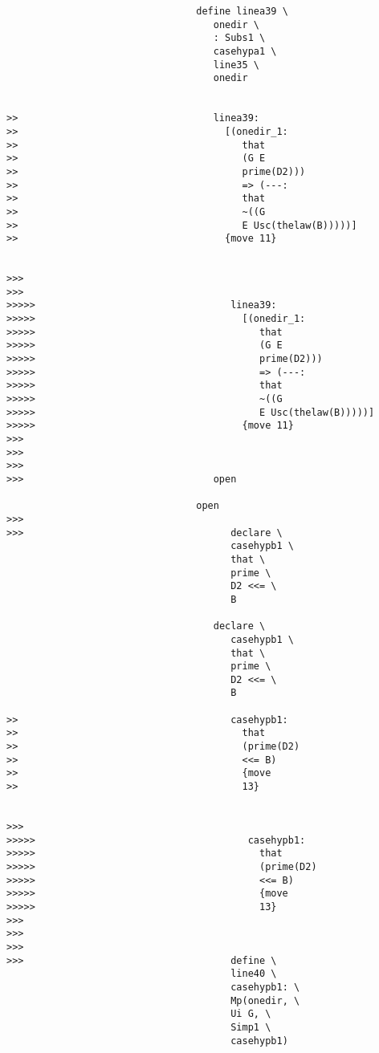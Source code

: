 \documentclass[12pt]{article}
\begin{document}
\begin{verbatim}
                                 define linea39 \
                                    onedir \
                                    : Subs1 \
                                    casehypa1 \
                                    line35 \
                                    onedir


>>                                  linea39:
>>                                    [(onedir_1:
>>                                       that
>>                                       (G E
>>                                       prime(D2)))
>>                                       => (---:
>>                                       that
>>                                       ~((G
>>                                       E Usc(thelaw(B)))))]
>>                                    {move 11}


>>>
>>>
>>>>>                                  linea39:
>>>>>                                    [(onedir_1:
>>>>>                                       that
>>>>>                                       (G E
>>>>>                                       prime(D2)))
>>>>>                                       => (---:
>>>>>                                       that
>>>>>                                       ~((G
>>>>>                                       E Usc(thelaw(B)))))]
>>>>>                                    {move 11}
>>>
>>>
>>>
>>>                                 open

                                 open
>>>
>>>                                    declare \
                                       casehypb1 \
                                       that \
                                       prime \
                                       D2 <<= \
                                       B

                                    declare \
                                       casehypb1 \
                                       that \
                                       prime \
                                       D2 <<= \
                                       B

>>                                     casehypb1:
>>                                       that
>>                                       (prime(D2)
>>                                       <<= B)
>>                                       {move
>>                                       13}


>>>
>>>>>                                     casehypb1:
>>>>>                                       that
>>>>>                                       (prime(D2)
>>>>>                                       <<= B)
>>>>>                                       {move
>>>>>                                       13}
>>>
>>>
>>>
>>>                                    define \
                                       line40 \
                                       casehypb1: \
                                       Mp(onedir, \
                                       Ui G, \
                                       Simp1 \
                                       casehypb1)


\end{verbatim}
\end{document}
